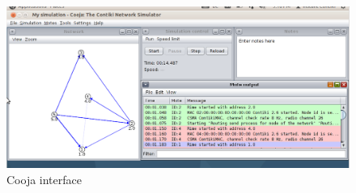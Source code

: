 \begin{figure}[!h]
    \centering
    \includegraphics[scale=0.4]{assets/cooja.png}
    \caption{\label{fig:cooja}Cooja interface}
\end{figure}

